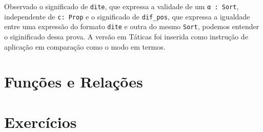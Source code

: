 Observado o significado de \lstinline{dite}, que expressa a validade de um 
\lstinline{α : Sort}, independente de \lstinline{c: Prop} e o significado 
de \lstinline{dif_pos}, que expressa a igualdade entre uma expressão do formato 
\lstinline{dite} e outra do mesmo \lstinline{Sort}, podemos entender o siginificado
dessa prova. A versão em Táticas foi inserida como instrução de aplicação em comparação
como o modo em termos. 

\section{Funções e Relações}

\section{Exercícios}
